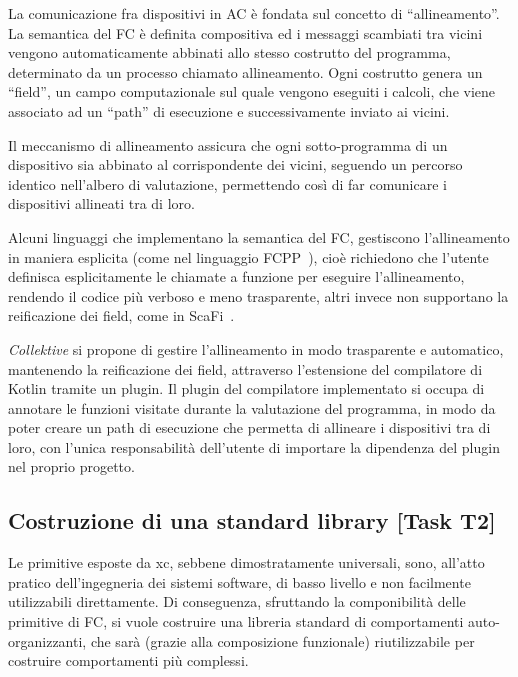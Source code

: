 \documentclass[13pt, a4paper]{article}
\newcommand{\ck}{\emph{Collektive}}
\begin{document}
La comunicazione fra dispositivi in \ac{AC} è fondata sul concetto di ``allineamento''.
%
La semantica del \ac{FC} è definita compositiva ed i messaggi scambiati tra vicini vengono automaticamente abbinati
    allo stesso costrutto del programma, determinato da un processo chiamato allineamento.
%
Ogni costrutto genera un ``field'', un campo computazionale sul quale vengono eseguiti i calcoli, che viene
associato ad un ``path'' di esecuzione e successivamente inviato ai vicini.

Il meccanismo di allineamento assicura che ogni sotto-programma di un dispositivo sia abbinato al corrispondente dei vicini,
    seguendo un percorso identico nell'albero di valutazione,
    permettendo così di far comunicare i dispositivi allineati tra di loro.

Alcuni linguaggi che implementano la semantica del \ac{FC}, gestiscono l'allineamento in maniera esplicita (come nel linguaggio FCPP~\cite{fcpp}),
cioè richiedono che l'utente definisca esplicitamente le chiamate a funzione per eseguire l'allineamento,
rendendo il codice più verboso e meno trasparente,
altri invece non supportano la reificazione dei field, come in ScaFi~\cite{scafi}.

\ck{} si propone di gestire l'allineamento in modo trasparente e automatico, mantenendo la reificazione dei field,
attraverso l'estensione del compilatore di Kotlin tramite un plugin.
%
Il plugin del compilatore implementato si occupa di annotare le funzioni visitate durante la valutazione del programma,
in modo da poter creare un path di esecuzione che permetta di allineare i dispositivi tra di loro, con l'unica
responsabilità dell'utente di importare la dipendenza del plugin nel proprio progetto.

\subsection{Costruzione di una standard library [Task T2]}\label{subsec:task-t2-[costruzione-di-una-standard-library]}

Le primitive esposte da \ac{xc}, sebbene dimostratamente universali,
sono, all'atto pratico dell'ingegneria dei sistemi software,
di basso livello e non facilmente utilizzabili direttamente.
%
Di conseguenza, sfruttando la componibilità delle primitive di \ac{FC},
si vuole costruire una libreria standard di comportamenti auto-organizzanti,
che sarà (grazie alla composizione funzionale) riutilizzabile per costruire comportamenti più complessi.
\end{document}
